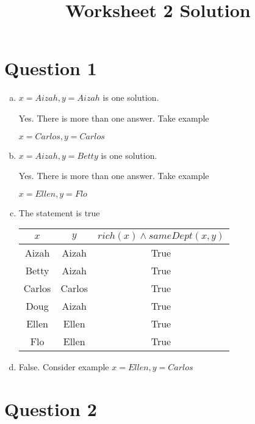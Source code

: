 \documentclass[12pt]{article}
\begin{document}
\title{Worksheet 2 Solution}
\maketitle

\section*{Question 1}

\begin{enumerate}[a)]
    \item
        $x = Aizah, y = Aizah$ is one solution.

        \bigskip

        Yes. There is more than one answer. Take example

        $x = Carlos, y = Carlos$

    \bigskip

    \item
        $x = Aizah, y = Betty$ is one solution.

        \bigskip

        Yes. There is more than one answer. Take example

        $x = Ellen, y = Flo$

    \item
        The statement is true

        \begin{tabular}{ c | c | c }
            $x$ & $y$ & $rich(x) \land sameDept(x,y)$ \\
            \hline
            Aizah & Aizah & True \\
            \hline
            Betty & Aizah & True \\
            \hline
            Carlos & Carlos & True \\
            \hline
            Doug & Aizah & True \\
            \hline
            Ellen & Ellen & True \\
            \hline
            Flo & Ellen & True \\
            \hline
        \end{tabular}

    \item
        False. Consider example $x = Ellen, y = Carlos$

\end{enumerate}

\section*{Question 2}
\end{document}
